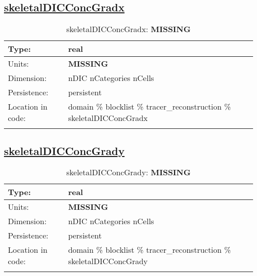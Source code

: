 \subsection[skeletalDICConcGradx]{\hyperref[sec:var_tab_tracer_reconstruction]{skeletalDICConcGradx}}
\label{subsec:var_sec_tracer_reconstruction_skeletalDICConcGradx}
\begin{center}
\begin{longtable}{| p{2.0in} | p{4.0in} |}
        \hline 
        Type: & real \\
        \hline 
        Units: & {\bf \color{red} MISSING} \\
        \hline 
        Dimension: & nDIC nCategories nCells \\
        \hline 
        Persistence: & persistent \\
        \hline 
         Location in code: & domain \% blocklist \% tracer\_reconstruction \% skeletalDICConcGradx \\
         \hline 
    \caption{skeletalDICConcGradx: {\bf \color{red} MISSING}}
\end{longtable}
\end{center}
\subsection[skeletalDICConcGrady]{\hyperref[sec:var_tab_tracer_reconstruction]{skeletalDICConcGrady}}
\label{subsec:var_sec_tracer_reconstruction_skeletalDICConcGrady}
\begin{center}
\begin{longtable}{| p{2.0in} | p{4.0in} |}
        \hline 
        Type: & real \\
        \hline 
        Units: & {\bf \color{red} MISSING} \\
        \hline 
        Dimension: & nDIC nCategories nCells \\
        \hline 
        Persistence: & persistent \\
        \hline 
         Location in code: & domain \% blocklist \% tracer\_reconstruction \% skeletalDICConcGrady \\
         \hline 
    \caption{skeletalDICConcGrady: {\bf \color{red} MISSING}}
\end{longtable}
\end{center}
